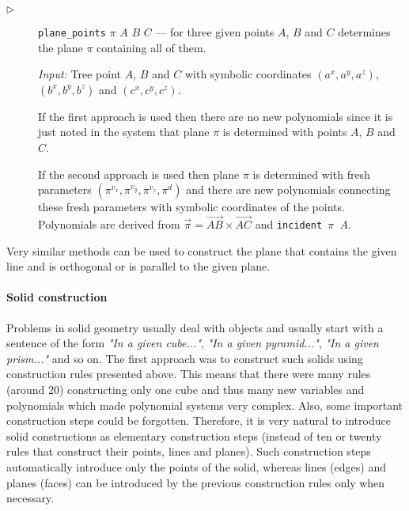 \documentclass[final,1p,times,authoryear]{elsarticle}
\begin{document}
\begin{description}
\item[$\triangleright$] {\tt plane\_points} $\pi$ $A$ $B$ $C$ --- for
  three given points $A$, $B$ and $C$ determines the plane $\pi$
  containing all of them.

{\em Input:} Tree point $A$, $B$ and $C$ with symbolic coordinates
$(a^x, a^y, a^z)$, $(b^x, b^y, b^z)$ and $(c^x, c^y, c^z)$.

If the first approach is used then there are no new polynomials since
it is just noted in the system that plane $\pi$ is determined with
points $A$, $B$ and $C$.

If the second approach is used then plane $\pi$ is determined with
fresh parameters $(\pi^{v_x}, \pi^{v_y}, \pi^{v_z}, \pi^{d})$ and
there are new polynomials connecting these fresh parameters with
symbolic coordinates of the points. Polynomials are derived from
$\overrightarrow{\pi} = \overrightarrow{AB} \times
\overrightarrow{AC}$ and {\tt incident $\pi$ $A$}.
\end{description}

Very similar methods can be used to construct the plane that contains
the given line and is orthogonal or is parallel to the given plane.

\paragraph{Solid construction}
\label{objectconstruction}

Problems in solid geometry usually deal with objects and usually start
with a sentence of the form {\em "In a given cube..."}, {\em "In a
  given pyramid..."}, {\em "In a given prism..."} and so on. The first
approach was to construct such solids using construction rules
presented above. This means that there were many rules (around 20)
constructing only one cube and thus many new variables and polynomials
which made polynomial systems very complex. Also, some important
construction steps could be forgotten. Therefore, it is very natural
to introduce solid constructions as elementary construction steps
(instead of ten or twenty rules that construct their points, lines and
planes). Such construction steps automatically introduce only the
points of the solid, whereas lines (edges) and planes (faces) can be
introduced by the previous construction rules only when necessary.
\end{document}
